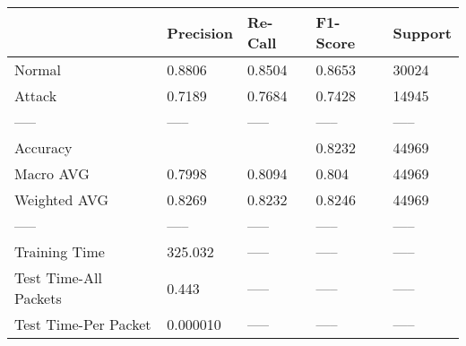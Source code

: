 \begin{tabular}{lllll}
\toprule
{} & Precision & Re-Call & F1-Score & Support \\
\midrule
Normal                &    0.8806 &  0.8504 &   0.8653 &   30024 \\
Attack                &    0.7189 &  0.7684 &   0.7428 &   14945 \\
-----                 &     ----- &   ----- &    ----- &   ----- \\
Accuracy              &           &         &   0.8232 &   44969 \\
Macro AVG             &    0.7998 &  0.8094 &    0.804 &   44969 \\
Weighted AVG          &    0.8269 &  0.8232 &   0.8246 &   44969 \\
-----                 &     ----- &   ----- &    ----- &   ----- \\
Training Time         &   325.032 &   ----- &    ----- &   ----- \\
Test Time-All Packets &     0.443 &   ----- &    ----- &   ----- \\
Test Time-Per Packet  &  0.000010 &   ----- &    ----- &   ----- \\
\bottomrule
\end{tabular}
